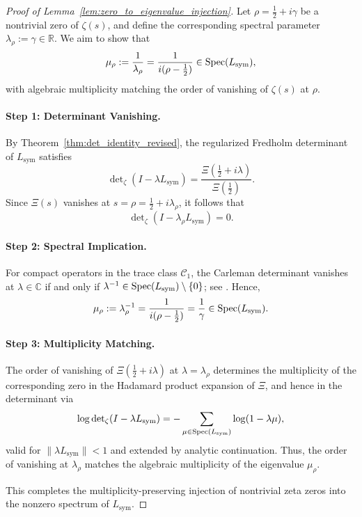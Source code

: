 \begin{proof}[Proof of Lemma~\ref{lem:zero_to_eigenvalue_injection}]
Let \( \rho = \tfrac{1}{2} + i\gamma \) be a nontrivial zero of \( \zeta(s) \), and define the corresponding spectral parameter \( \lambda_\rho := \gamma \in \mathbb{R} \). We aim to show that
\[
\mu_\rho := \frac{1}{\lambda_\rho} = \frac{1}{i(\rho - \tfrac{1}{2})} \in \operatorname{Spec}(L_{\mathrm{sym}}),
\]
with algebraic multiplicity matching the order of vanishing of \( \zeta(s) \) at \( \rho \).

\paragraph{Step 1: Determinant Vanishing.}
By Theorem~\ref{thm:det_identity_revised}, the regularized Fredholm determinant of \( L_{\mathrm{sym}} \) satisfies
\[
\det\nolimits_\zeta(I - \lambda L_{\mathrm{sym}}) = \frac{\Xi(\tfrac{1}{2} + i\lambda)}{\Xi(\tfrac{1}{2})}.
\]
Since \( \Xi(s) \) vanishes at \( s = \rho = \tfrac{1}{2} + i\lambda_\rho \), it follows that
\[
\det\nolimits_\zeta(I - \lambda_\rho L_{\mathrm{sym}}) = 0.
\]

\paragraph{Step 2: Spectral Implication.}
For compact operators in the trace class \( \mathcal{C}_1 \), the Carleman determinant vanishes at \( \lambda \in \mathbb{C} \) if and only if \( \lambda^{-1} \in \operatorname{Spec}(L_{\mathrm{sym}}) \setminus \{0\} \); see \cite{Simon2005TraceIdeals}. Hence,
\[
\mu_\rho := \lambda_\rho^{-1} = \frac{1}{i(\rho - \tfrac{1}{2})} = \frac{1}{\gamma} \in \operatorname{Spec}(L_{\mathrm{sym}}).
\]

\paragraph{Step 3: Multiplicity Matching.}
The order of vanishing of \( \Xi(\tfrac{1}{2} + i\lambda) \) at \( \lambda = \lambda_\rho \) determines the multiplicity of the corresponding zero in the Hadamard product expansion of \( \Xi \), and hence in the determinant via
\[
\log \det\nolimits_\zeta(I - \lambda L_{\mathrm{sym}}) = -\sum_{\mu \in \operatorname{Spec}(L_{\mathrm{sym}})} \log(1 - \lambda \mu),
\]
valid for \( \| \lambda L_{\mathrm{sym}} \| < 1 \) and extended by analytic continuation. Thus, the order of vanishing at \( \lambda_\rho \) matches the algebraic multiplicity of the eigenvalue \( \mu_\rho \).

\medskip
\noindent
This completes the multiplicity-preserving injection of nontrivial zeta zeros into the nonzero spectrum of \( L_{\mathrm{sym}} \).
\end{proof}
%  